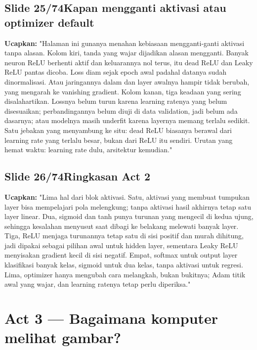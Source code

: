 \documentclass[11pt]{article}
\renewcommand{\framebox}[1]{\colorbox{acc!15}{\textcolor{acc}{\textbf{#1}}}}
\begin{document}
\subsection*{\framebox{Slide 25/74}\quad Kapan mengganti aktivasi atau optimizer default}
\textbf{Ucapkan:} "Halaman ini gunanya menahan kebiasaan mengganti-ganti aktivasi tanpa alasan. Kolom kiri, tanda yang wajar dijadikan alasan mengganti. Banyak neuron ReLU berhenti aktif dan keluarannya nol terus, itu dead ReLU dan Leaky ReLU pantas dicoba. Loss diam sejak epoch awal padahal datanya sudah dinormalisasi. Atau jaringannya dalam dan layer awalnya hampir tidak berubah, yang mengarah ke vanishing gradient. Kolom kanan, tiga keadaan yang sering disalahartikan. Lossnya belum turun karena learning ratenya yang belum disesuaikan; perbandingannya belum diuji di data validation, jadi belum ada dasarnya; atau modelnya masih underfit karena layernya memang terlalu sedikit. Satu jebakan yang menyambung ke situ: dead ReLU biasanya berawal dari learning rate yang terlalu besar, bukan dari ReLU itu sendiri. Urutan yang hemat waktu: learning rate dulu, arsitektur kemudian."\\[2pt]

\subsection*{\framebox{Slide 26/74}\quad Ringkasan Act 2}
\textbf{Ucapkan:} "Lima hal dari blok aktivasi. Satu, aktivasi yang membuat tumpukan layer bisa mempelajari pola melengkung; tanpa aktivasi hasil akhirnya tetap satu layer linear. Dua, sigmoid dan tanh punya turunan yang mengecil di kedua ujung, sehingga kesalahan menyusut saat dibagi ke belakang melewati banyak layer. Tiga, ReLU menjaga turunannya tetap satu di sisi positif dan murah dihitung, jadi dipakai sebagai pilihan awal untuk hidden layer, sementara Leaky ReLU menyisakan gradient kecil di sisi negatif. Empat, softmax untuk output layer klasifikasi banyak kelas, sigmoid untuk dua kelas, tanpa aktivasi untuk regresi. Lima, optimizer hanya mengubah cara melangkah, bukan bukitnya; Adam titik awal yang wajar, dan learning ratenya tetap perlu diperiksa."\\[2pt]

\section{Act 3 — Bagaimana komputer melihat gambar?}
\end{document}

